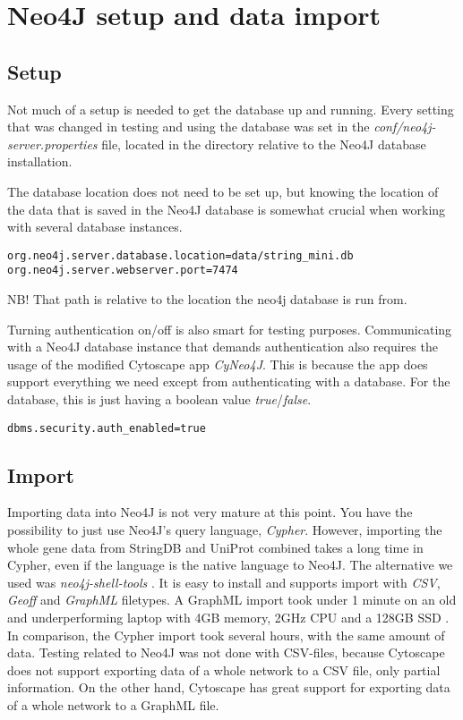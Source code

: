 \section{Neo4J setup and data import}

\subsection{Setup}
Not much of a setup is needed to get the database up and running. Every setting
that was changed in testing and using the database was set in the
\textit{conf/neo4j-server.properties} file, located in the directory relative to
the Neo4J database installation.

The database
location does not need to be set up, but knowing the location of the data that
is saved in the Neo4J database is somewhat crucial when working with several
database instances.

\begin{verbatim}
org.neo4j.server.database.location=data/string_mini.db
org.neo4j.server.webserver.port=7474
\end{verbatim}

NB! That path is relative to the location the neo4j database is run from.

Turning authentication on/off is also smart for testing purposes. Communicating
with a Neo4J database instance that demands authentication also requires the
usage of the modified Cytoscape app \textit{CyNeo4J}. This is because the app
does support everything we need except from authenticating with a database. For
the database, this is just having a boolean value \textit{true}/\textit{false}.

\begin{verbatim}
dbms.security.auth_enabled=true
\end{verbatim}

\subsection{Import}
Importing data into Neo4J is not very mature at this point. You have the
possibility to just use Neo4J's query language, \textit{Cypher}. However,
importing the whole gene data from StringDB and UniProt combined takes a long
time in Cypher, even if the language is the native language to Neo4J. The
alternative we used was \textit{neo4j-shell-tools} \cite{neo4j-tools}. It is
easy to install and supports import with \textit{CSV}, \textit{Geoff} and
\textit{GraphML} filetypes. A GraphML import took under 1 minute on an old and
underperforming laptop with 4GB memory, 2GHz CPU and a 128GB SSD \cite{laptop}.
In comparison, the Cypher import took several hours, with the same amount of
data. Testing related to Neo4J was not done with CSV-files, because Cytoscape
does not support exporting data of a whole network to a CSV file, only partial
information. On the other hand, Cytoscape has great support for exporting data
of a whole network to a GraphML file.

